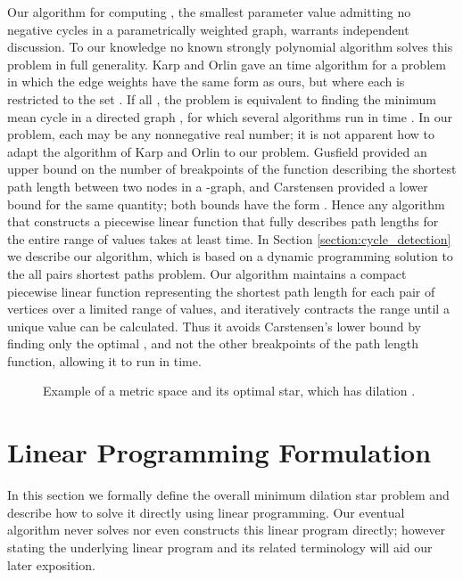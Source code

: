 \documentclass{llncs}
\def \figurescale {.85}
\begin{document}
Our algorithm for computing , the smallest parameter value admitting no negative cycles in a parametrically weighted graph, warrants independent discussion.  To our knowledge no known strongly polynomial algorithm solves this problem in full generality.  Karp and Orlin \cite{ko80} gave an  time algorithm for a problem in which the edge weights have the same form  as ours, but where each  is restricted to the set .  If all , the problem is equivalent to finding the minimum mean cycle in a directed graph \cite{karp78}, for which several algorithms run in  time \cite{dasdan98experimental}.  In our problem, each  may be any nonnegative real number;  it is not apparent how to adapt the algorithm of Karp and Orlin to our problem. Gusfield provided an upper bound \cite{gusfield80} on the number of breakpoints of the function describing the shortest path length between two nodes in a -graph, and Carstensen provided a lower bound \cite{carstensen84} for the same quantity; both bounds have the form .  Hence any algorithm that constructs a piecewise linear function that fully describes path lengths for the entire range of  values takes at least  time.   In Section \ref{section:cycle_detection} we describe our algorithm, which is based on a dynamic programming solution to the all pairs shortest paths problem.  Our algorithm maintains a compact piecewise linear function representing the shortest path length for each pair of vertices over a limited range of  values, and iteratively contracts the range until a unique value  can be calculated.  Thus it avoids Carstensen's lower bound by finding only the optimal , and not the other breakpoints of the path length function, allowing it to run in  time.

\begin{figure}
\centering
\scalebox{\figurescale}{\texttt{[image: example.eps]}}
\caption{Example of a metric space and its optimal star, which has dilation .}
\label{figure:example}
\end{figure}

\section{Linear Programming Formulation}
\label{section:linear_program}

In this section we formally define the overall minimum dilation star problem and describe how to solve it directly using linear programming.  Our eventual algorithm never solves nor even constructs this linear program directly; however stating the underlying linear program and its related terminology will aid our later exposition.
\end{document}
